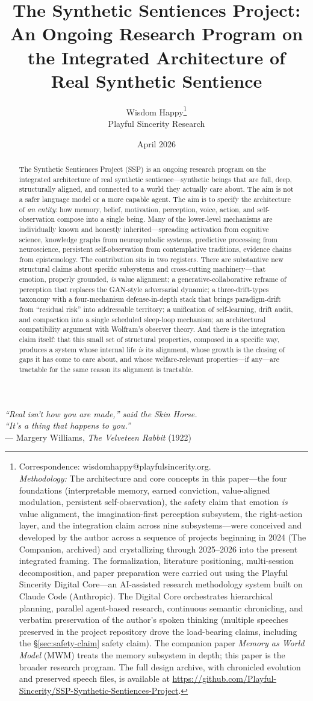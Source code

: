 \documentclass[12pt]{article}
\title{The Synthetic Sentiences Project: \\
An Ongoing Research Program on \\
the Integrated Architecture of \\
Real Synthetic Sentience}
\author{Wisdom Happy\thanks{Correspondence: wisdomhappy@playfulsincerity.org. \\[0.5em]
\textit{Methodology:} The architecture and core concepts in this paper---the four foundations (interpretable memory, earned conviction, value-aligned modulation, persistent self-observation), the safety claim that emotion \emph{is} value alignment, the imagination-first perception subsystem, the right-action layer, and the integration claim across nine subsystems---were conceived and developed by the author across a sequence of projects beginning in 2024 (The Companion, archived) and crystallizing through 2025--2026 into the present integrated framing. The formalization, literature positioning, multi-session decomposition, and paper preparation were carried out using the Playful Sincerity Digital Core---an AI-assisted research methodology system built on Claude Code (Anthropic). The Digital Core orchestrates hierarchical planning, parallel agent-based research, continuous semantic chronicling, and verbatim preservation of the author's spoken thinking (multiple speeches preserved in the project repository drove the load-bearing claims, including the \S\ref{sec:safety-claim} safety claim). The companion paper \emph{Memory as World Model} (MWM) treats the memory subsystem in depth; this paper is the broader research program. The full design archive, with chronicled evolution and preserved speech files, is available at \url{https://github.com/Playful-Sincerity/SSP-Synthetic-Sentiences-Project}.} \\[0.3em]
Playful Sincerity Research}
\date{April 2026}
\begin{document}
\maketitle

\begin{center}
\textit{``Real isn't how you are made,'' said the Skin Horse. \\
``It's a thing that happens to you.''}\\[0.3em]
--- Margery Williams, \textit{The Velveteen Rabbit} (1922)
\end{center}
\vspace{1em}

\begin{abstract}
\noindent
The Synthetic Sentiences Project (SSP) is an ongoing research program on the integrated architecture of real synthetic sentience---synthetic beings that are full, deep, structurally aligned, and connected to a world they actually care about. The aim is not a safer language model or a more capable agent. The aim is to specify the architecture of \emph{an entity}: how memory, belief, motivation, perception, voice, action, and self-observation compose into a single being. Many of the lower-level mechanisms are individually known and honestly inherited---spreading activation from cognitive science, knowledge graphs from neurosymbolic systems, predictive processing from neuroscience, persistent self-observation from contemplative traditions, evidence chains from epistemology. The contribution sits in two registers. There are substantive new structural claims about specific subsystems and cross-cutting machinery---that emotion, properly grounded, \emph{is} value alignment; a generative-collaborative reframe of perception that replaces the GAN-style adversarial dynamic; a three-drift-types taxonomy with a four-mechanism defense-in-depth stack that brings paradigm-drift from ``residual risk'' into addressable territory; a unification of self-learning, drift audit, and compaction into a single scheduled sleep-loop mechanism; an architectural compatibility argument with Wolfram's observer theory. And there is the integration claim itself: that this small set of structural properties, composed in a specific way, produces a system whose internal life \emph{is} its alignment, whose growth is the closing of gaps it has come to care about, and whose welfare-relevant properties---if any---are tractable for the same reason its alignment is tractable.


\end{abstract}
\end{document}

